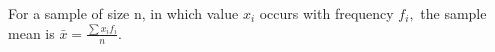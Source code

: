 For a sample of size n, in which value $ x_i $ occurs with
frequency $ f_i , $ the sample mean is
$ \bar{x} = \frac{\sum x_i f_i }{n} . $